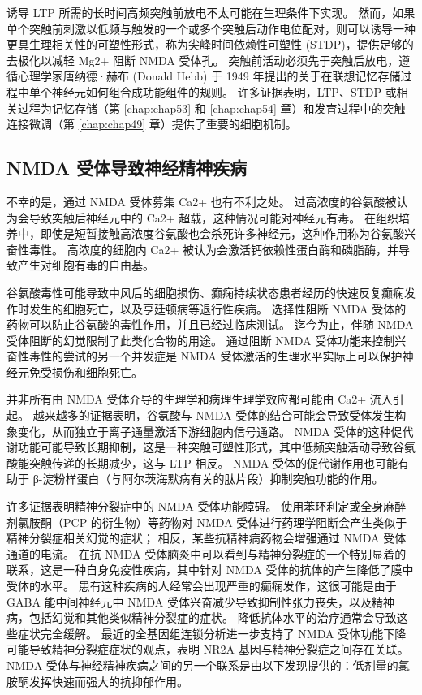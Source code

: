 诱导 LTP 所需的长时间高频突触前放电不太可能在生理条件下实现。 
然而，如果单个突触前刺激以低频与触发的一个或多个突触后动作电位配对，则可以诱导一种更具生理相关性的可塑性形式，称为尖峰时间依赖性可塑性 (STDP)，提供足够的去极化以减轻 Mg2+ 阻断 NMDA 受体孔。 
突触前活动必须先于突触后放电，遵循心理学家唐纳德·赫布 (Donald Hebb) 于 1949 年提出的关于在联想记忆存储过程中单个神经元如何组合成功能组件的规则。 许多证据表明，LTP、STDP 或相关过程为记忆存储（第 \ref{chap:chap53} 和 \ref{chap:chap54} 章）和发育过程中的突触连接微调（第 \ref{chap:chap49} 章）提供了重要的细胞机制。



\subsection{NMDA 受体导致神经精神疾病}

不幸的是，通过 NMDA 受体募集 Ca2+ 也有不利之处。 过高浓度的谷氨酸被认为会导致突触后神经元中的 Ca2+ 超载，这种情况可能对神经元有毒。
在组织培养中，即使是短暂接触高浓度谷氨酸也会杀死许多神经元，这种作用称为谷氨酸兴奋性毒性。 
高浓度的细胞内 Ca2+ 被认为会激活钙依赖性蛋白酶和磷脂酶，并导致产生对细胞有毒的自由基。


谷氨酸毒性可能导致中风后的细胞损伤、癫痫持续状态患者经历的快速反复癫痫发作时发生的细胞死亡，以及亨廷顿病等退行性疾病。 
选择性阻断 NMDA 受体的药物可以防止谷氨酸的毒性作用，并且已经过临床测试。 
迄今为止，伴随 NMDA 受体阻断的幻觉限制了此类化合物的用途。 
通过阻断 NMDA 受体功能来控制兴奋性毒性的尝试的另一个并发症是 NMDA 受体激活的生理水平实际上可以保护神经元免受损伤和细胞死亡。


并非所有由 NMDA 受体介导的生理学和病理生理学效应都可能由 Ca2+ 流入引起。 
越来越多的证据表明，谷氨酸与 NMDA 受体的结合可能会导致受体发生构象变化，从而独立于离子通量激活下游细胞内信号通路。 
NMDA 受体的这种促代谢功能可能导致长期抑制，这是一种突触可塑性形式，其中低频突触活动导致谷氨酸能突触传递的长期减少，这与 LTP 相反。 
NMDA 受体的促代谢作用也可能有助于 β-淀粉样蛋白（与阿尔茨海默病有关的肽片段）抑制突触功能的作用。


许多证据表明精神分裂症中的 NMDA 受体功能障碍。 
使用苯环利定或全身麻醉剂氯胺酮（PCP 的衍生物）等药物对 NMDA 受体进行药理学阻断会产生类似于精神分裂症相关幻觉的症状； 
相反，某些抗精神病药物会增强通过 NMDA 受体通道的电流。 
在抗 NMDA 受体脑炎中可以看到与精神分裂症的一个特别显着的联系，这是一种自身免疫性疾病，其中针对 NMDA 受体的抗体的产生降低了膜中受体的水平。 
患有这种疾病的人经常会出现严重的癫痫发作，这很可能是由于 GABA 能中间神经元中 NMDA 受体兴奋减少导致抑制性张力丧失，以及精神病，包括幻觉和其他类似精神分裂症的症状。 
降低抗体水平的治疗通常会导致这些症状完全缓解。 
最近的全基因组连锁分析进一步支持了 NMDA 受体功能下降可能导致精神分裂症症状的观点，表明 NR2A 基因与精神分裂症之间存在关联。 
NMDA 受体与神经精神疾病之间的另一个联系是由以下发现提供的：低剂量的氯胺酮发挥快速而强大的抗抑郁作用。



